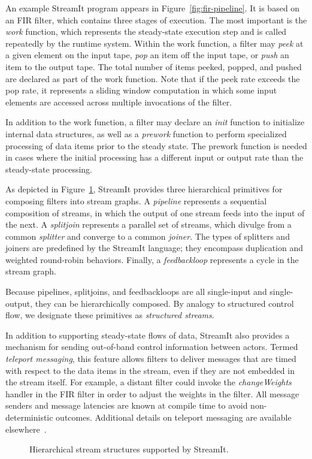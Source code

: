 An example StreamIt program appears in Figure~\ref{fig:fir-pipeline}.
It is based on an FIR filter, which contains three stages of
execution.  The most important is the {\it work} function, which
represents the steady-state execution step and is called repeatedly by
the runtime system.  Within the work function, a filter may {\it peek}
at a given element on the input tape, {\it pop} an item off the input
tape, or {\it push} an item to the output tape.  The total number of
items peeked, popped, and pushed are declared as part of the work
function.  Note that if the peek rate exceeds the pop rate, it
represents a sliding window computation in which some input elements
are accessed across multiple invocations of the filter.

In addition to the work function, a filter may declare an {\it init}
function to initialize internal data structures, as well as a {\it
  prework} function to perform specialized processing of data items
prior to the steady state.  The prework function is needed in cases
where the initial processing has a different input or output rate than
the steady-state processing.

As depicted in Figure~\ref{fig:structures}, StreamIt provides three
hierarchical primitives for composing filters into stream graphs.  A
{\it pipeline} represents a sequential composition of streams, in
which the output of one stream feeds into the input of the next.  A
{\it splitjoin} represents a parallel set of streams, which divulge
from a common {\it splitter} and converge to a common {\it joiner}.
The types of splitters and joiners are predefined by the StreamIt
language; they encompass duplication and weighted round-robin
behaviors.  Finally, a {\it feedbackloop} represents a cycle in the
stream graph.

\enlargethispage*{12pt}

Because pipelines, splitjoins, and feedbackloops are all single-input
and single-output, they can be hierarchically composed.  By analogy to
structured control flow, we designate these primitives as {\it
  structured streams}.

In addition to supporting steady-state flows of data, StreamIt also
provides a mechanism for sending out-of-band control information
between actors.  Termed {\it teleport messaging}, this feature allows
filters to deliver messages that are timed with respect to the data
items in the stream, even if they are not embedded in the stream
itself.  For example, a distant filter could invoke the {\it
  changeWeights} handler in the FIR filter in order to adjust the
weights in the filter.  All message senders and message latencies are
known at compile time to avoid non-deterministic outcomes.  Additional
details on teleport messaging are available
elsewhere~\cite{thies-ppopp05}.

\begin{figure}[t!]
\caption{Hierarchical stream structures supported by StreamIt.\protect\label{fig:structures}}
\end{figure}

